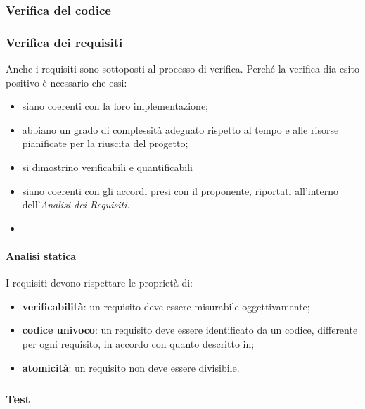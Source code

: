 \subsubsection{Verifica del codice}

\subsubsection{Verifica dei requisiti}
Anche i requisiti sono sottoposti al processo di verifica. Perché la verifica dia esito positivo è ncessario che essi:
\begin{itemize}
    \item siano coerenti con la loro implementazione;
    \item abbiano un grado di complessità adeguato rispetto al tempo e alle risorse pianificate per la riuscita del progetto;
    \item si dimostrino verificabili e quantificabili
    \item siano coerenti con gli accordi presi con il proponente, riportati all'interno dell'\textit{Analisi dei Requisiti}.
    \item 
\end{itemize}
\paragraph{Analisi statica}
I requisiti devono rispettare le proprietà di:
\begin{itemize}
    \item \textbf{verificabilità}: un requisito deve essere misurabile oggettivamente;
    \item \textbf{codice univoco}: un requisito deve essere identificato da un codice, differente per ogni requisito, in accordo con quanto descritto in; %
    \item \textbf{atomicità}: un requisito non deve essere divisibile. %
\end{itemize}

\subsubsection{Test}
